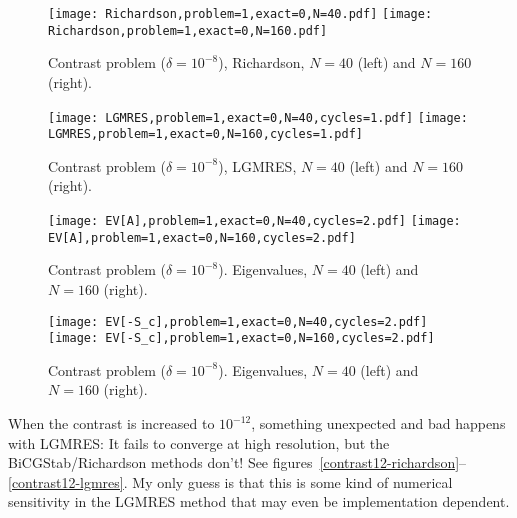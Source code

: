\documentclass{article}
\begin{document}
\begin{figure}
\begin{center}
\texttt{[image: Richardson,problem=1,exact=0,N=40.pdf]}
\texttt{[image: Richardson,problem=1,exact=0,N=160.pdf]}
\caption{Contrast problem ($\delta=10^{-8}$), Richardson, $N=40$ (left) and $N=160$ (right).}
\label{contrast-richardson}
\end{center}
\end{figure}

\begin{figure}
\begin{center}
\texttt{[image: LGMRES,problem=1,exact=0,N=40,cycles=1.pdf]}
\texttt{[image: LGMRES,problem=1,exact=0,N=160,cycles=1.pdf]}
\caption{Contrast problem ($\delta=10^{-8}$), LGMRES, $N=40$ (left) and $N=160$ (right).}
\label{contrast-lgmres}
\end{center}
\end{figure}

\begin{figure}
\begin{center}
\texttt{[image: EV[A],problem=1,exact=0,N=40,cycles=2.pdf]}
\texttt{[image: EV[A],problem=1,exact=0,N=160,cycles=2.pdf]}
\caption{Contrast problem ($\delta=10^{-8}$). Eigenvalues, $N=40$ (left) and $N=160$ (right).}
\label{contrast-evA}
\end{center}
\end{figure}

\begin{figure}
\begin{center}
\texttt{[image: EV[-S\_c],problem=1,exact=0,N=40,cycles=2.pdf]}
\texttt{[image: EV[-S\_c],problem=1,exact=0,N=160,cycles=2.pdf]}
\caption{Contrast problem ($\delta=10^{-8}$). Eigenvalues, $N=40$ (left) and $N=160$ (right).}
\end{center}
\label{contrast-evS}
\end{figure}

\FloatBarrier

When the contrast is increased to $10^{-12}$, something unexpected and bad happens with LGMRES: It fails to converge at high resolution, but the BiCGStab/Richardson methods don't! See figures~\ref{contrast12-richardson}--\ref{contrast12-lgmres}. My only guess is that this is some kind of numerical sensitivity in the LGMRES method that may even be implementation dependent.
\end{document}
